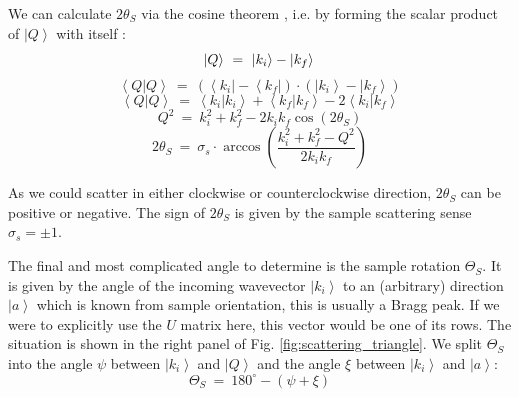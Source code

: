 We can calculate $2 \theta_S$ via the cosine theorem \cite[pp. 694-695]{Arens2015}, i.e.
by forming the scalar product of $\left| Q \right>$ with itself \cite[p. 11]{Shirane2002}:
\begin{equation} 
	\left| Q \right> \ =\  \left| k_i \right> - \left| k_f \right> \\ 
\end{equation}
\begin{equation} 
	\left< Q | Q \right> \ =\  \left( \left< k_i \right| - \left< k_f \right| \right) \cdot \left( \left| k_i \right> - \left| k_f \right> \right)
\end{equation}
\begin{equation} 
	\left< Q | Q \right> \ =\  \left< k_i | k_i \right> + \left< k_f | k_f \right> - 2 \left< k_i | k_f \right> 
\end{equation}
\begin{equation} 
	Q^2 \ =\  k_i^2 + k_f^2 - 2 k_i k_f \cos \left( 2 \theta_S \right) 
\end{equation}
\begin{equation}
	\boxed{ 2 \theta_S \ =\  \sigma_s \cdot \arccos \left( \frac{k_i^2 + k_f^2 - Q^2}{2 k_i k_f} \right) } 
\end{equation}

As we could scatter in either clockwise or counterclockwise direction, $2 \theta_S$ can be positive or negative.
The sign of $2 \theta_S$ is given by the sample scattering sense $\sigma_s = \pm 1$.


\vspace{0.5cm}


The final and most complicated angle to determine is the sample rotation $\Theta_S$.
It is given by the angle of the incoming wavevector $\left| k_i \right>$ to an (arbitrary) direction 
$\left| a \right>$ which is known from sample orientation, this is usually a Bragg peak. 
If we were to explicitly use the $U$ matrix here, this vector would be one of its rows.
The situation is shown in the right panel of Fig. \ref{fig:scattering_triangle}.
We split $\Theta_S$ into the angle $\psi$ between $\left| k_i \right>$ and $\left| Q \right>$ 
and the angle $\xi$ between $\left| k_i \right>$ and $\left| a \right>$:
\begin{equation} \boxed{ \Theta_S \ =\  180^{\circ} - \left( \psi + \xi \right) } \end{equation}


\vspace{0.5cm}


